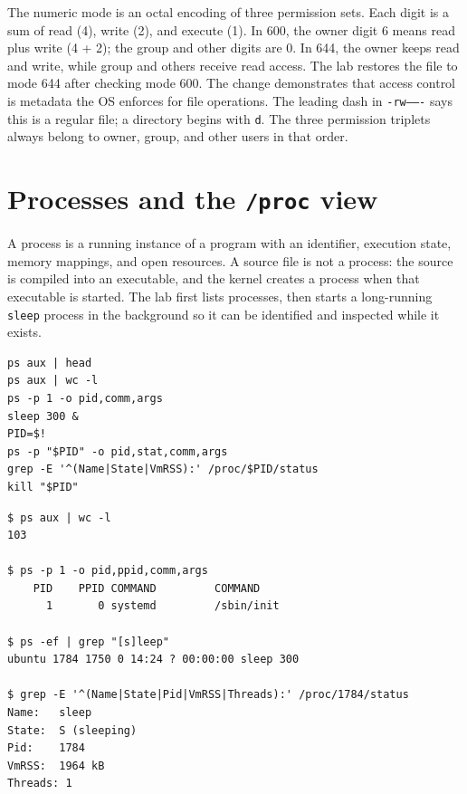 \documentclass{assets/utmreport}
\begin{document}
The numeric mode is an octal encoding of three permission sets. Each digit is a sum of read (4), write (2), and execute (1). In 600, the owner digit 6 means read plus write (4 + 2); the group and other digits are 0. In 644, the owner keeps read and write, while group and others receive read access. The lab restores the file to mode 644 after checking mode 600. The change demonstrates that access control is metadata the OS enforces for file operations. The leading dash in \texttt{-rw-------} says this is a regular file; a directory begins with \texttt{d}. The three permission triplets always belong to owner, group, and other users in that order.

\section{Processes and the \texttt{/proc} view}

A process is a running instance of a program with an identifier, execution state, memory mappings, and open resources. A source file is not a process: the source is compiled into an executable, and the kernel creates a process when that executable is started. The lab first lists processes, then starts a long-running \texttt{sleep} process in the background so it can be identified and inspected while it exists.

\noindent\begin{minipage}{\linewidth}
\begin{lstlisting}[caption={Process discovery and state inspection}]
ps aux | head
ps aux | wc -l
ps -p 1 -o pid,comm,args
sleep 300 &
PID=$!
ps -p "$PID" -o pid,stat,comm,args
grep -E '^(Name|State|VmRSS):' /proc/$PID/status
kill "$PID"
\end{lstlisting}
\end{minipage}\par


\noindent\begin{minipage}{\linewidth}
\begin{lstlisting}[caption={Observed PID 1, process count, and sleep state}]
$ ps aux | wc -l
103

$ ps -p 1 -o pid,ppid,comm,args
    PID    PPID COMMAND         COMMAND
      1       0 systemd         /sbin/init

$ ps -ef | grep "[s]leep"
ubuntu 1784 1750 0 14:24 ? 00:00:00 sleep 300

$ grep -E '^(Name|State|Pid|VmRSS|Threads):' /proc/1784/status
Name:   sleep
State:  S (sleeping)
Pid:    1784
VmRSS:  1964 kB
Threads: 1
\end{lstlisting}
\end{minipage}\par
\end{document}
